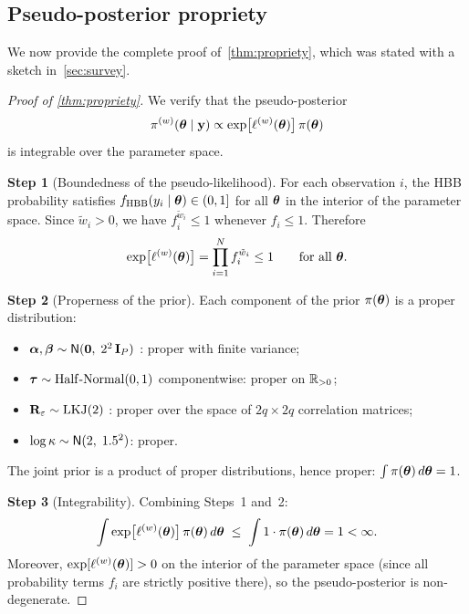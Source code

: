 
\subsection{Pseudo-posterior propriety}
\label{smc:propriety}

We now provide the complete proof of~\cref{thm:propriety}, which was
stated with a sketch in~\cref{sec:survey}.

\begin{proof}[Proof of \textup{\cref{thm:propriety}}]
  We verify that the pseudo-posterior
  \[
    \pi^{(w)}(\boldsymbol{\theta} \mid \mathbf{y}) \propto
    \exp\bigl[\ell^{(w)}(\boldsymbol{\theta})\bigr]\,\pi(\boldsymbol{\theta})
  \]
  is integrable over the parameter space.

  \textup{\textbf{Step 1} (Boundedness of the pseudo-likelihood).}
  For each observation $i$, the HBB probability satisfies
  $f_{\operatorname{HBB}}(y_i \mid \boldsymbol{\theta}) \in (0, 1]$ for all $\boldsymbol{\theta}$ in the
  interior of the parameter space.  Since $\tilde{w}_i > 0$, we have
  $f_i^{\tilde{w}_i} \le 1$ whenever $f_i \le 1$.  Therefore
  \[
    \exp\bigl[\ell^{(w)}(\boldsymbol{\theta})\bigr]
    = \prod_{i=1}^{N} f_i^{\tilde{w}_i}
    \le 1
    \qquad \text{for all } \boldsymbol{\theta}.
  \]

  \textup{\textbf{Step 2} (Properness of the prior).}
  Each component of the prior $\pi(\boldsymbol{\theta})$ is a proper distribution:
  \begin{itemize}[nosep]
    \item $\boldsymbol{\alpha}, \boldsymbol{\beta} \sim \textsf{N}(\mathbf{0},\; 2^2\,\mathbf{I}_P)$
      \citep{GelmanEtAl2008}: proper with finite variance;
    \item $\boldsymbol{\tau} \sim \operatorname{Half\text{-}Normal}(0, 1)$ componentwise:
      proper on $\mathbb{R}_{>0}$;
    \item $\mathbf{R}_\varepsilon \sim \operatorname{LKJ}(2)$
      \citep{LewandowskiEtAl2009}: proper over the space of
      $2q \times 2q$ correlation matrices;
    \item $\log\kappa \sim \textsf{N}(2,\; 1.5^2)$: proper.
  \end{itemize}
  The joint prior is a product of proper distributions, hence proper:
  $\int \pi(\boldsymbol{\theta})\,d\boldsymbol{\theta} = 1$.

  \textup{\textbf{Step 3} (Integrability).}
  Combining Steps~1 and~2:
  \[
    \int \exp\bigl[\ell^{(w)}(\boldsymbol{\theta})\bigr]\,\pi(\boldsymbol{\theta})\,d\boldsymbol{\theta}
    \;\le\;
    \int 1 \cdot \pi(\boldsymbol{\theta})\,d\boldsymbol{\theta}
    = 1 < \infty.
  \]
  Moreover, $\exp[\ell^{(w)}(\boldsymbol{\theta})] > 0$ on the interior of the
  parameter space (since all probability terms $f_i$ are strictly
  positive there), so the pseudo-posterior is non-degenerate.
\end{proof}


